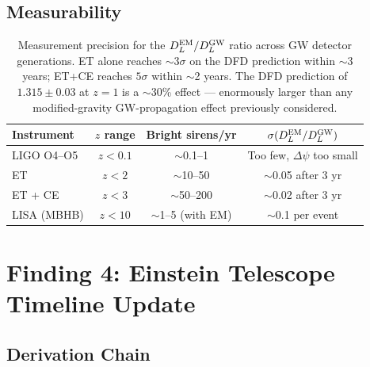 \documentclass[11pt]{article}
\begin{document}
\subsection{Measurability}

\begin{table}[h]
\centering
\begin{tabular}{lccc}
\toprule
\textbf{Instrument} & \textbf{$z$ range} & \textbf{Bright sirens/yr} &
  \textbf{$\sigma(D_L^{\rm EM}/D_L^{\rm GW})$} \\
\midrule
LIGO O4--O5 & $z < 0.1$ & $\sim$0.1--1 & Too few, $\Delta\psi$ too small \\
ET & $z < 2$ & $\sim$10--50 & $\sim$0.05 after 3 yr \\
ET + CE & $z < 3$ & $\sim$50--200 & $\sim$0.02 after 3 yr \\
LISA (MBHB) & $z < 10$ & $\sim$1--5 (with EM) & $\sim$0.1 per event \\
\bottomrule
\end{tabular}
\caption{Measurement precision for the $D_L^{\rm EM}/D_L^{\rm GW}$
ratio across GW detector generations. ET alone reaches $\sim$3$\sigma$
on the DFD prediction within $\sim$3 years; ET+CE reaches $5\sigma$ within
$\sim$2 years. The DFD prediction of $1.315 \pm 0.03$ at $z = 1$ is a
$\sim$30\% effect --- enormously larger than any modified-gravity
GW-propagation effect previously considered.}
\end{table}

\section{Finding 4: Einstein Telescope Timeline Update}
\label{sec:et}

\subsection{Derivation Chain}
\end{document}
